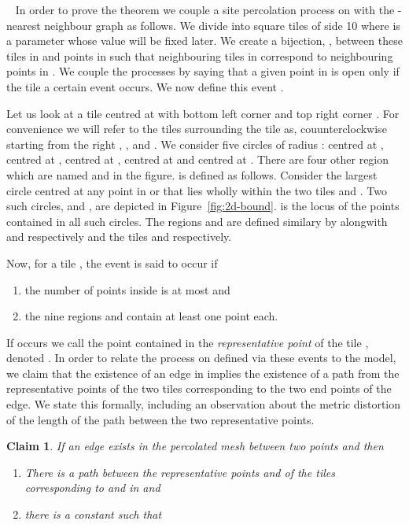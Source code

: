 \documentclass[11pt]{article}
\newtheorem{claim}[theorem]{Claim}
\newcommand{\sq}{\hbox{\rlap{}}}
\newcommand{\qed}{\hspace*{\fill}\sq}
\newenvironment{proof}{\noindent {\bf Proof.}\ }{\qed\par\vskip 4mm\par}
\begin{document}
\begin{proof} In order to prove the theorem we couple a site
percolation process on  with the -nearest neighbour graph as
follows. We divide  into square tiles of side 10 where 
is a parameter whose value will be fixed later. We create a bijection,
, between these tiles in  and points in  such that
neighbouring tiles in  correspond to neighbouring points in
. We couple the processes by saying that a given point  in
 is open only if the tile  a certain event
 occurs. We now define this event .

Let us look at a tile centred at  with bottom left corner
 and top right corner . For convenience we will
refer to the tiles surrounding the tile  as, couunterclockwise
starting from the right , ,  and . We consider
five circles of radius :  centred at ,  centred at
,  centred at ,  centred at  and
 centred at . There are four other region which are
named  and  in the figure.  is defined as
follows. Consider the largest circle centred at any point in  or
 that lies wholly within the two tiles  and . Two such
circles,  and , are depicted in
Figure~\ref{fig:2d-bound}.  is the locus of the points contained
in all such circles. The regions  and  are defined
similary by  alongwith  and  respectively and the
tiles  and  respectively. 

Now, for a tile , the event  is said to occur if
\begin{enumerate}
\item the number of points inside  is at most  and 
\item the nine regions  and
   contain at least one point each.
\end{enumerate}

If  occurs we call the point contained in  the {\em
representative point} of the tile , denoted . In order to
relate the process on  defined via these events  to the
 model, we claim that the existence of an edge in 
implies the existence of a path from the representative points of the
two tiles corresponding to the two end points of the edge. We state
this formally, including an observation about the metric distortion of
the length of the path between the two representative points.

\begin{claim}
\label{clm:coupling}
If an edge exists in the percolated mesh  between two points
 and   then
\begin{enumerate}
\item There is a path between the representative points
   and  of the tiles
  corresponding to  and  in  and
\item there is a constant  such that 
 

\end{enumerate}
\end{claim}
\end{proof}
\end{document}
